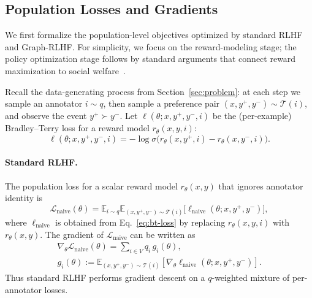 \documentclass{article}
\theoremstyle{plain}
\theoremstyle{definition}
\theoremstyle{remark}
\begin{document}
\subsection{Population Losses and Gradients}

We first formalize the population-level objectives optimized by standard RLHF
and Graph-RLHF. For simplicity, we focus on the reward-modeling stage; the
policy optimization stage follows by standard arguments that connect reward
maximization to social welfare~\citep{kaufmann2025survey}.

Recall the data-generating process from
Section~\ref{sec:problem}: at each step we sample an annotator $i \sim q$,
then sample a preference pair $(x,y^+,y^-) \sim \mathcal{T}(i)$, and observe
the event $y^+ \succ y^-$. Let
$\ell(\theta; x,y^+,y^-,i)$ be the (per-example) Bradley--Terry loss for a
reward model $r_\theta(x,y,i)$:
\begin{equation}
    \ell(\theta; x,y^+,y^-,i)
    =
    - \log \sigma\big(
        r_\theta(x,y^+,i) - r_\theta(x,y^-,i)
    \big).
    \label{eq:bt-loss}
\end{equation}

\paragraph{Standard RLHF.}
The population loss for a scalar reward model
$r_\theta(x,y)$ that ignores annotator identity is
\begin{equation}
    \mathcal{L}_{\text{naive}}(\theta)
    =
    \mathbb{E}_{i \sim q}
    \mathbb{E}_{(x,y^+,y^-) \sim \mathcal{T}(i)}
    \Big[
        \ell_{\text{naive}}(\theta; x,y^+,y^-)
    \Big],
    \label{eq:naive-pop-loss}
\end{equation}
where $\ell_{\text{naive}}$ is obtained from Eq.~\eqref{eq:bt-loss} by
replacing $r_\theta(x,y,i)$ with $r_\theta(x,y)$.
The gradient of $\mathcal{L}_{\text{naive}}$ can be written as
\begin{equation}
\begin{aligned}
    \nabla_\theta \mathcal{L}_{\text{naive}}(\theta)
    =
    \sum_{i \in V} q_i \, g_i(\theta), \qquad\qquad \\
    g_i(\theta)
    :=
    \mathbb{E}_{(x,y^+,y^-) \sim \mathcal{T}(i)}
    [
        \nabla_\theta \ell_{\text{naive}}(\theta; x,y^+,y^-)
    ].
    \label{eq:naive-grad}
\end{aligned}
\end{equation}
Thus standard RLHF performs gradient descent on a $q$-weighted mixture of
per-annotator losses.
\end{document}
